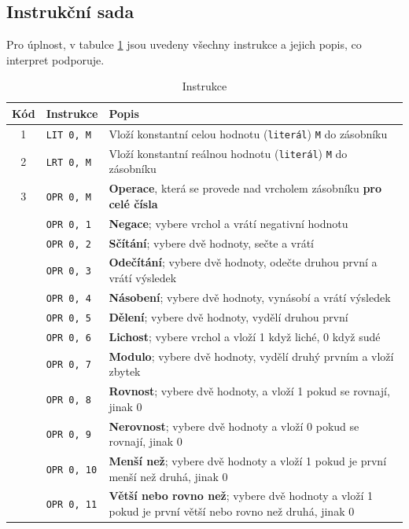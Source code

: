 \documentclass[
12pt,
a4paper,
pdftex,
czech,
titlepage
]{report}
\begin{document}
\subsection{Instrukční sada}
Pro úplnost, v tabulce \ref{instrukce} jsou uvedeny všechny instrukce a jejich popis, co interpret podporuje.
\begin{longtable}{|c|l|p{10cm}|}
\caption{Instrukce}
\label{instrukce}
\endfirsthead
\endhead
\hline
		Kód & Instrukce & Popis \\
\hline\hline
\rule{0pt}{3ex}1 & \texttt{LIT 0, M} & Vloží konstantní celou hodnotu (\texttt{literál}) \texttt{M} do zásobníku \\ \hline
\rule{0pt}{3ex}2 & \texttt{LRT 0, M} & Vloží konstantní reálnou hodnotu (\texttt{literál}) \texttt{M} do zásobníku \\ \hline
\rule{0pt}{3ex}3 & \texttt{OPR 0, M} & \textbf{Operace}, která se provede nad vrcholem zásobníku \textbf{pro celé čísla} \\ \hline
\rule{0pt}{3ex} & \texttt{OPR 0, 1} & \textbf{Negace}; vybere vrchol a vrátí negativní hodnotu \\ \hline
\rule{0pt}{3ex} & \texttt{OPR 0, 2} & \textbf{Sčítání}; vybere dvě hodnoty, sečte a vrátí \\ \hline
\rule{0pt}{3ex} & \texttt{OPR 0, 3} & \textbf{Odečítání}; vybere dvě hodnoty, odečte druhou první a vrátí výsledek \\ \hline
\rule{0pt}{3ex} & \texttt{OPR 0, 4} & \textbf{Násobení}; vybere dvě hodnoty, vynásobí a vrátí výsledek \\ \hline
\rule{0pt}{3ex} & \texttt{OPR 0, 5} & \textbf{Dělení}; vybere dvě hodnoty, vydělí druhou první \\ \hline
\rule{0pt}{3ex} & \texttt{OPR 0, 6} & \textbf{Lichost}; vybere vrchol a vloží 1 když liché, 0 když sudé \\ \hline
\rule{0pt}{3ex} & \texttt{OPR 0, 7} & \textbf{Modulo}; vybere dvě hodnoty, vydělí druhý prvním a vloží zbytek \\ \hline
\rule{0pt}{3ex} & \texttt{OPR 0, 8} & \textbf{Rovnost}; vybere dvě hodnoty, a vloží 1 pokud se rovnají, jinak 0 \\ \hline
\rule{0pt}{3ex} & \texttt{OPR 0, 9} & \textbf{Nerovnost}; vybere dvě hodnoty a vloží 0 pokud se rovnají, jinak 0 \\ \hline
\rule{0pt}{3ex} & \texttt{OPR 0, 10} & \textbf{Menší než}; vybere dvě hodnoty a vloží 1 pokud je první menší než druhá, jinak 0 \\ \hline
\rule{0pt}{3ex} & \texttt{OPR 0, 11} & \textbf{Větší nebo rovno než}; vybere dvě hodnoty a vloží 1 pokud je první větší nebo rovno než druhá, jinak 0 \\ \hline

\end{longtable}
\end{document}
